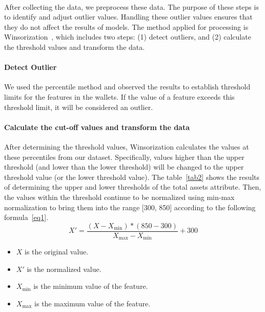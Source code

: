 \documentclass[../ICIT-Paper-2024.tex]{subfiles}
\begin{document}
\paragraph{}

After collecting the data, we preprocess these data. The purpose of these steps is to identify and adjust outlier values. Handling these outlier values ensures that they do not affect the results of models. The method applied for processing is Winsorization~\cite{dixon1974trimming}, which includes two steps: (1) detect outliers, and (2) calculate the threshold values and transform the data.

\paragraph{Detect Outlier}

We used the percentile method and observed the results to establish threshold limits for the features in the wallets. If the value of a feature exceeds this threshold limit, it will be considered an outlier.

\paragraph{Calculate the cut-off values and transform the data}

After determining the threshold values, Winsorization calculates the values at these percentiles from our dataset. Specifically, values higher than the upper threshold (and lower than the lower threshold) will be changed to the upper threshold value (or the lower threshold value). The table~\ref{tab2} shows the results of determining the upper and lower thresholds of the total assets attribute. Then, the values within the threshold continue to be normalized using min-max normalization to bring them into the range [300, 850] according to the following formula~\ref{eq1}.
\begin{equation}\label{eq1}
X' = \frac{(X - X_{\text{min}})*(850-300)}{X_{\text{max}} - X_{\text{min}}} + 300
\end{equation}

\begin{itemize}
    \item \( X \) is the original value.
    \item \( X' \) is the normalized value.
    \item \( X_{\text{min}} \) is the minimum value of the feature.
    \item \( X_{\text{max}} \) is the maximum value of the feature.
\end{itemize}
\end{document}
